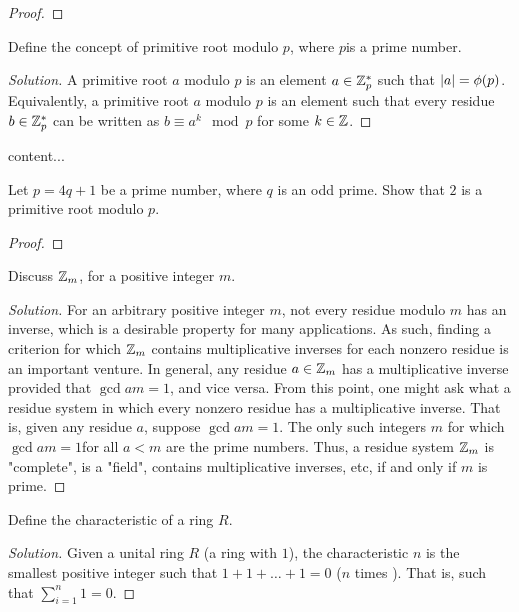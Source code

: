 \documentclass[11pt]{article}
\begin{document}
\begin{proof}

\end{proof}

\begin{exercise}{8}
Define the concept of primitive root modulo $ p $, where $ p $is a prime number.
\end{exercise}

\begin{proof}[Solution]
A primitive root $ a $ modulo $ p $ is an element $ a \in \mathbb{Z}_{p}^{*} $ such that $ |a| = \phi(p) $. Equivalently, a primitive root $ a $ modulo $ p $ is an element such that every residue $ b \in \mathbb{Z}_{p}^{*} $ can be written as $ b \equiv a^{k} \mod p$ for some $ k \in \mathbb{Z} $.
\end{proof}

\begin{exercise}{9}
content...
\end{exercise}

\begin{exercise}{10}
Let $ p = 4q + 1$ be a prime number, where $ q $ is an odd prime. Show that $ 2 $ is a primitive root modulo $ p $.
\end{exercise}

\begin{proof}

\end{proof}

\begin{exercise}{10}
Discuss $ \mathbb{Z}_{m} $, for a positive integer $ m $.
\end{exercise}

\begin{proof}[Solution]
For an arbitrary positive integer $ m $, not every residue modulo $ m $ has an inverse, which is a desirable property for many applications. As such, finding a criterion for which $ \mathbb{Z}_{m} $ contains multiplicative inverses for each nonzero residue is an important venture. In general, any residue $ a \in \mathbb{Z}_{m} $ has a multiplicative inverse provided that $ \gcd{a}{m} = 1 $, and vice versa. From this point, one might ask what a residue system in which every nonzero residue has a multiplicative inverse. That is, given any residue $ a $, suppose $ \gcd{a}{m} = 1 $. The only such integers $ m $ for which $ \gcd{a}{m}  = 1 $for all $ a < m $ are the prime numbers. Thus, a residue system $ \mathbb{Z}_{m} $ is "complete", is a "field", contains multiplicative inverses, etc, if and only if $ m $ is prime.
\end{proof}

\begin{exercise}{12}
Define the characteristic of a ring $ R $.
\end{exercise}

\begin{proof}[Solution]
Given a unital ring $ R $ (a ring with $ 1 $), the characteristic $ n $ is the smallest positive integer such that $ 1 + 1 + \dots + 1 = 0 $ ($ n $ times ). That is, such that
$ \sum_{i = 1}^{n} 1 = 0$.
\end{proof}
\end{document}
